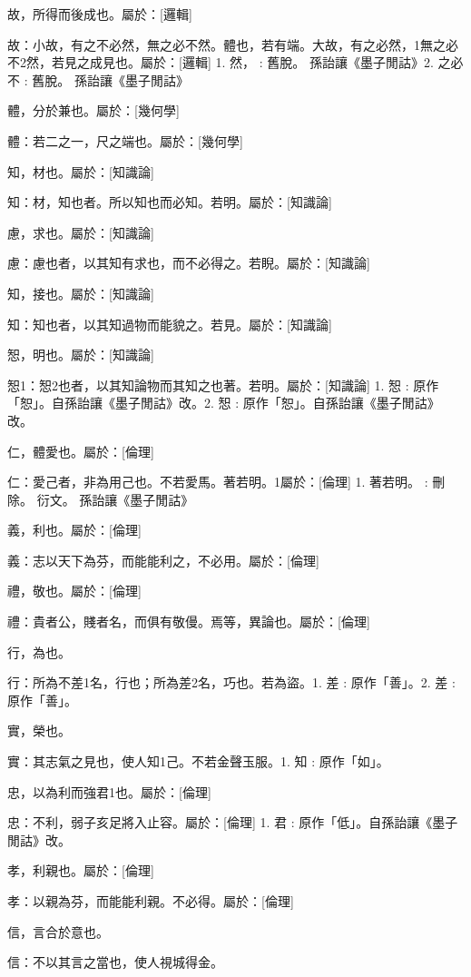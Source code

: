 
\begin{pinyinscope}
故，所得而後成也。屬於：[邏輯]

故：小故，有之不必然，無之必不然。體也，若有端。大故，有之必然，1無之必不2然，若見之成見也。屬於：[邏輯] 
1. 然， : 舊脫。  孫詒讓《墨子閒詁》2. 之必不 : 舊脫。  孫詒讓《墨子閒詁》

體，分於兼也。屬於：[幾何學]

體：若二之一，尺之端也。屬於：[幾何學]

知，材也。屬於：[知識論]

知：材，知也者。所以知也而必知。若明。屬於：[知識論]

慮，求也。屬於：[知識論]

慮：慮也者，以其知有求也，而不必得之。若睨。屬於：[知識論]

知，接也。屬於：[知識論]

知：知也者，以其知過物而能貌之。若見。屬於：[知識論]

𢜔，明也。屬於：[知識論]

𢜔1：𢜔2也者，以其知論物而其知之也著。若明。屬於：[知識論] 
1. 𢜔 : 原作「恕」。自孫詒讓《墨子閒詁》改。2. 𢜔 : 原作「恕」。自孫詒讓《墨子閒詁》改。

仁，體愛也。屬於：[倫理]

仁：愛己者，非為用己也。不若愛馬。著若明。1屬於：[倫理] 
1. 著若明。 : 刪除。 衍文。 孫詒讓《墨子閒詁》

義，利也。屬於：[倫理]

義：志以天下為芬，而能能利之，不必用。屬於：[倫理]

禮，敬也。屬於：[倫理]

禮：貴者公，賤者名，而俱有敬僈。焉等，異論也。屬於：[倫理]

行，為也。

行：所為不差1名，行也；所為差2名，巧也。若為盜。1. 差 : 原作「善」。2. 差 : 原作「善」。

實，榮也。

實：其志氣之見也，使人知1己。不若金聲玉服。1. 知 : 原作「如」。

忠，以為利而強君1也。屬於：[倫理]

忠：不利，弱子亥足將入止容。屬於：[倫理] 
1. 君 : 原作「低」。自孫詒讓《墨子閒詁》改。

孝，利親也。屬於：[倫理]

孝：以親為芬，而能能利親。不必得。屬於：[倫理]

信，言合於意也。

信：不以其言之當也，使人視城得金。


\end{pinyinscope}
